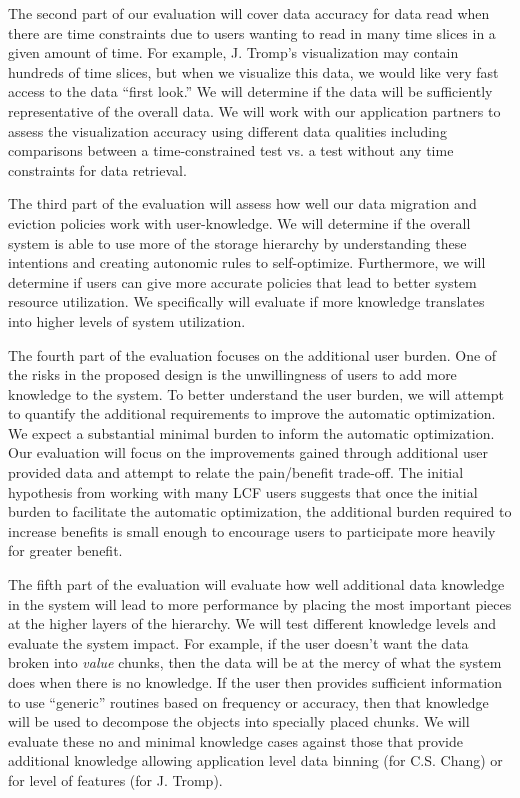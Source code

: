 The second part of our evaluation will cover data accuracy for data read when
there are time constraints due to users wanting to read in many time slices in
a given amount of time. For example, J. Tromp's visualization may contain
hundreds of time slices, but when we visualize this data, we would like very
fast access to the data ``first look.'' We will determine if the data will be
sufficiently representative of the overall data.  We will work with our
application partners to assess the visualization accuracy using different data
qualities including comparisons between a time-constrained test vs. a test
without any time constraints for data retrieval.

The third part of the evaluation will assess how well our data migration and
eviction policies work with user-knowledge. We will determine if the overall
system is able to use more of the storage hierarchy by understanding these
intentions and creating autonomic rules to self-optimize. Furthermore, we will
determine if users can give more accurate policies that lead to better system
resource utilization. We specifically will evaluate if more knowledge
translates into higher levels of system utilization.

The fourth part of the evaluation focuses on the additional user burden. One of
the risks in the proposed design is the unwillingness of users to add more
knowledge to the system. To better understand the user burden, we will attempt
to quantify the additional requirements to improve the automatic optimization.
We expect a substantial minimal burden to inform the automatic optimization.
Our evaluation will focus on the improvements gained through additional user
provided data and attempt to relate the pain/benefit trade-off. The initial
hypothesis from working with many LCF users suggests that once the initial
burden to facilitate the automatic optimization, the additional burden required
to increase benefits is small enough to encourage users to participate more
heavily for greater benefit.

The fifth part of the evaluation will evaluate how well additional data
knowledge in the system will lead to more performance by placing the most
important pieces at the higher layers of the hierarchy. We will test different
knowledge levels and evaluate the system impact.  For example, if the user
doesn't want the data broken into {\it value} chunks, then the data will be at
the mercy of what the system does when there is no knowledge. If the user then 
provides sufficient information to use ``generic'' routines based on frequency
or accuracy, then that knowledge will be used to decompose the objects into
specially placed chunks. We will evaluate these no and minimal knowledge cases
against those that provide additional knowledge allowing application level data
binning (for C.S. Chang) or for level of features (for J. Tromp).

